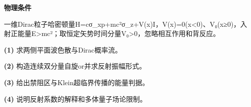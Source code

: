 \textbf{物理条件}\par 一维Dirac粒子哈密顿量H=cσ\_xp+mc²σ\_z+V(x)I，V(x)=0(x<0)、V₀(x≥0)，入射正能量E>mc²；取恒定矢势时间分量V₀>0，忽略相互作用和背反应。
\par\noindent\textbf{(1)} 求两侧平面波色散与Dirac概率流。
\par\noindent\textbf{(2)} 构造连续双分量自旋or并求反射振幅形式。
\par\noindent\textbf{(3)} 给出禁阻区与Klein超临界传播的能量判据。
\par\noindent\textbf{(4)} 说明反射系数的解释和多体量子场论限制。
